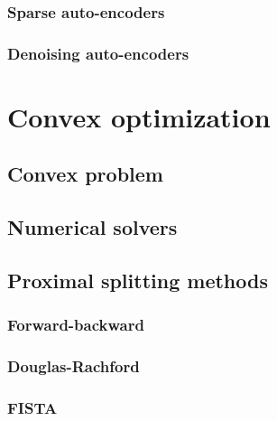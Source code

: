\documentclass[a4paper,12pt,twoside]{report}
\begin{document}
\subsection{Sparse auto-encoders}

\subsection{Denoising auto-encoders}

\chapter{Convex optimization}

\section{Convex problem}

\section{Numerical solvers}

\section{Proximal splitting methods}

\subsection{Forward-backward}

\subsection{Douglas-Rachford}

\subsection{FISTA}
\end{document}

